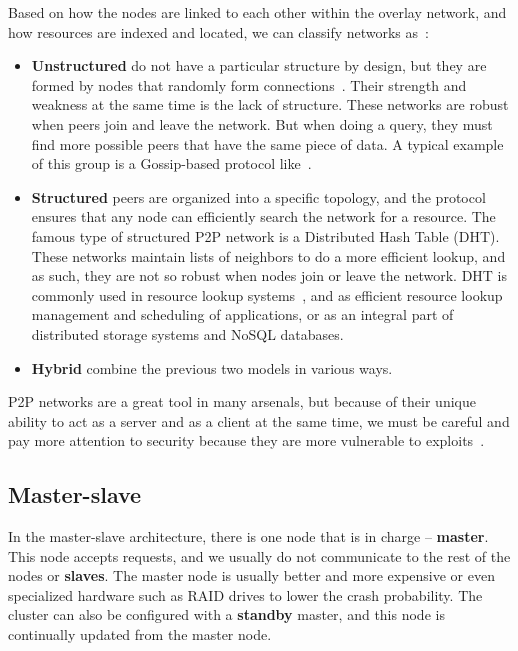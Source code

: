 Based on how the nodes are linked to each other within the overlay network, and how resources are indexed and located, we can classify networks as~\cite{KamelSE07}:

\begin{itemize}
	\item \textbf{Unstructured} do not have a particular structure by design, but they are formed by nodes that randomly form connections~\cite{FilaliBHB11}. Their strength and weakness at the same time is the lack of structure. These networks are robust when peers join and leave the network. But when doing a query, they must find more possible peers that have the same piece of data. A typical example of this group is a Gossip-based protocol like~\cite{DasGM02}.
	\item \textbf{Structured} peers are organized into a specific topology, and the protocol ensures that any node can efficiently search the network for a resource. The famous type of structured P2P network is a Distributed Hash Table (DHT). These networks maintain lists of neighbors to do a more efficient lookup, and as such, they are not so robust when nodes join or leave the network. DHT is commonly used in resource lookup systems~\cite{StoicaMKKB01}, and as efficient resource lookup management and scheduling of applications, or as an integral part of distributed storage systems and NoSQL\cite{Leavitt10} databases.
	\item \textbf{Hybrid} combine the previous two models in various ways.
\end{itemize}

\noindent
P2P networks are a great tool in many arsenals, but because of their unique ability to act as a server and as a client at the same time, we must be careful and pay more attention to security because they are more vulnerable to exploits~\cite{0024003}.
%
%
\subsection{Master-slave}\label{sec:master_slave}
%
In the master-slave architecture, there is one node that is in charge -- \textbf{master}. This node accepts requests, and we usually do not communicate to the rest of the nodes or \textbf{slaves}. The master node is usually better and more expensive or even specialized hardware such as RAID drives to lower the crash probability. The cluster can also be configured with a \textbf{standby} master, and this node is continually updated from the master node.

